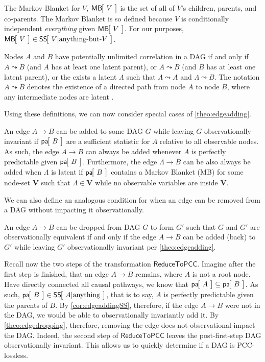 The Markov Blanket for $V$, $\NamedFunction{MB}{\!V\!}$ is the set of all of $V$'s children, parents, and co-parents. The Markov Blanket is so defined because $V$ is conditionally independent \emph{everything} given $\NamedFunction{MB}{\!V\!}$. For our purposes, ${\NamedFunction{MB}{\!V\!}\in\NamedFunction{SS}{\!V|\text{anything-but-}V\!}}$.

Nodes $A$ and $B$ have potentially unlimited correlation in a DAG if and only if $A \leadsto  B$ (and $A$ has at least one latent parent), or $A\leadsto B$ (and $B$ has at least one latent parent), or the exists a latent $\Lambda$ such that $\Lambda\leadsto A$ and $\Lambda\leadsto B$.
The notation $A \leadsto  B$ denotes the existence of a directed path from node $A$ to node $B$, where any intermediate nodes are latent \cite{pusey2014gdag}.

Using these definitions, we can now consider special cases of \cref{theo:edgeadding}.
\begin{corollary}\label{cor:edgeaddingSS}
An edge $A\to B$ can be added to some DAG $G$ while leaving $G$ observationally invariant if $\NamedFunction{pa}{\!B\!}$ are a sufficient statistic for $A$ relative to all observable nodes.
As such, the edge $A\to B$ can always be added whenever $A$ is perfectly predictable given $\NamedFunction{pa}{\!B\!}$.
Furthermore, the edge $\Lambda\to B$ can be also always be added when $\Lambda$ is latent if $\NamedFunction{pa}{\!B\!}$ contains a Markov Blanket (MB) for some node-set $\bm{V}$ such that $\Lambda\in \bm{V}$ while no observable variables are inside $\bm{V}$. 
\end{corollary}

We can also define an analogous condition for when an edge can be removed from a DAG without impacting it observationally.
\begin{theorem}\label{theo:edgedropping}
An edge $A\to B$ can be dropped from DAG $G$ to form $G'$ such that $G$ and $G'$ are observationally equivalent if and only if the edge $A\to B$ can be added (back) to $G'$ while leaving $G'$ observationally invariant per \cref{theo:edgeadding}.
\end{theorem}

Recall now the two steps of the transformation $\mathsf{ReduceToPCC}$. Imagine after the first step is finished, that an edge $A\to B$ remains, where $A$ is not a root node. Have directly connected all causal pathways, we know that $\NamedFunction{pa}{\!A\!}\subseteq\NamedFunction{pa}{\!B\!}$. As such, $\NamedFunction{pa}{\!B\!}\in\NamedFunction{SS}{\!A|\text{anything}\!}$, that is to say, $A$ is perfectly predictable given the parents of $B$. By \cref{cor:edgeaddingSS}, therefore, if the edge $A \to B$ were not in the DAG, we would be able to observationally invariantly add it. By \cref{theo:edgedropping}, therefore, removing the edge does not observational impact the DAG. Indeed, the second step of $\mathsf{ReduceToPCC}$ leaves the post-first-step DAG observationally invariant. This allows us to quickly determine if a DAG is PCC-lossless.

